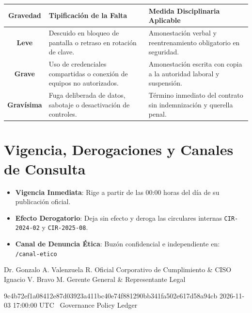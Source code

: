 \documentclass[11pt,letterpaper]{article}
\begin{document}
\noindent
\begin{tabularx}{\linewidth}{@{}c p{3.6cm} X@{}}
  \toprule
  \textbf{\color{corpPrimary}Gravedad} & \textbf{\color{corpPrimary}Tipificaci\'on de la Falta} & \textbf{\color{corpPrimary}Medida Disciplinaria Aplicable} \\
  \midrule
  \textbf{Leve} & Descuido en bloqueo de pantalla o retraso en rotaci\'on de clave. & Amonestaci\'on verbal y reentrenamiento obligatorio en seguridad. \\
  \addlinespace[2pt]
  \textbf{\color{corpWarning}Grave} & Uso de credenciales compartidas o conexi\'on de equipos no autorizados. & Amonestaci\'on escrita con copia a la autoridad laboral y suspensi\'on. \\
  \addlinespace[2pt]
  \textbf{\color{corpDanger}Grav\'isima} & Fuga deliberada de datos, sabotaje o desactivaci\'on de controles. & T\'ermino inmediato del contrato sin indemnizaci\'on y querella penal. \\
  \bottomrule
\end{tabularx}

\vspace{0.4em}


\vspace{0.4em}

\section{Vigencia, Derogaciones y Canales de Consulta}

\begin{itemize}[leftmargin=1.5em, itemsep=1pt, topsep=1pt]
  \item \textbf{Vigencia Inmediata}: Rige a partir de las 00:00 horas del d\'ia de su publicaci\'on oficial.
  \item \textbf{Efecto Derogatorio}: Deja sin efecto y deroga las circulares internas \texttt{CIR-2024-02} y \texttt{CIR-2025-08}.
  \item \textbf{Canal de Denuncia \'Etica}: Buz\'on confidencial e independiente en:\\[1pt]
  \texttt{\corporatebrandweb/canal-etico}
\end{itemize}

\dualcontrolsignature
  {Dr. Gonzalo A. Valenzuela R.}
  {Oficial Corporativo de Cumplimiento \& CISO}
  {\corporatebrandlegal}
  {Ignacio V. Bravo M.}
  {Gerente General \& Representante Legal}
  {\corporatebrandlegal}

\vspace{0.5em}

\cryptoseal
  {9c4b72ef1a08412e87d03923a411bc40e74f881290bb341fa502e617d58a94cb}
  {2026-11-03 17:00:00 UTC}
  {\corporatebrandname\ Governance Policy Ledger}
\end{document}
